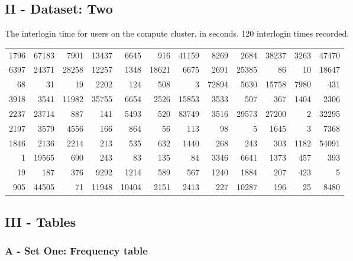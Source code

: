 \documentclass[10pt]{report}
\begin{document}

\subsection*{II - Dataset: Two}

The interlogin time for users on the compute cluster, in seconds. 120 interlogin times recorded.

\begin{tabular}{rrrrrrrrrrrr}
    \hline
    1796 & 67183 &  7901 & 13437 &  6645 &   916 & 41159 &  8269 &  2684 & 38237 & 3263 & 47470 \\
    6397 & 24371 & 28258 & 12257 &  1348 & 18621 &  6675 &  2691 & 25385 &    86 &   10 & 18647 \\
    68 &    31 &    19 &  2202 &   124 &   508 &     3 & 72894 &  5630 & 15758 & 7980 &   431 \\
    3918 &  3541 & 11982 & 35755 &  6654 &  2526 & 15853 &  3533 &   507 &   367 & 1404 &  2306 \\
    2237 & 23714 &   887 &   141 &  5493 &   520 & 83749 &  3516 & 29573 & 27200 &    2 & 32295 \\
    2197 &  3579 &  4556 &   166 &   864 &    56 &   113 &    98 &     5 &  1645 &    3 &  7368 \\
    1846 &  2136 &  2214 &   213 &   535 &   632 &  1440 &   268 &   243 &   303 & 1182 & 54091 \\
    1 & 19565 &   690 &   243 &    83 &   135 &    84 &  3346 &  6641 &  1373 &  457 &   393 \\
    19 &   187 &   376 &  9292 &  1214 &   589 &   567 &  1240 &  1884 &   207 &  423 &     5 \\
    905 & 44505 &    71 & 11948 & 10404 &  2151 &  2413 &   227 & 10287 &   196 &   25 &  8480 \\
    \hline
\end{tabular}


\subsection*{III - Tables}

\subsubsection*{A - Set One: Frequency table}
\end{document}
